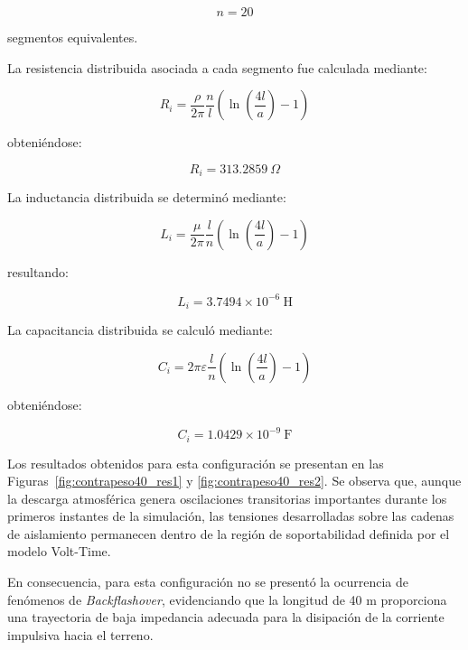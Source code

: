 \documentclass[12pt,letterpaper]{article}
\begin{document}
\begin{equation*}
n=20
\end{equation*}

segmentos equivalentes.

La resistencia distribuida asociada a cada segmento fue calculada mediante:

\begin{equation}
R_i=
\frac{\rho}{2\pi}
\frac{n}{l}
\left(
\ln
\left(
\frac{4l}{a}
\right)-1
\right)
\label{eq:r40}
\end{equation}

obteniéndose:

\begin{equation*}
R_i=313.2859\ \Omega
\end{equation*}

La inductancia distribuida se determinó mediante:

\begin{equation}
L_i=
\frac{\mu}{2\pi}
\frac{l}{n}
\left(
\ln
\left(
\frac{4l}{a}
\right)-1
\right)
\label{eq:l40}
\end{equation}

resultando:

\begin{equation*}
L_i=3.7494\times10^{-6}\ \mathrm{H}
\end{equation*}

La capacitancia distribuida se calculó mediante:

\begin{equation}
C_i=
2\pi\varepsilon
\frac{l}{n}
\left(
\ln
\left(
\frac{4l}{a}
\right)-1
\right)
\label{eq:c40}
\end{equation}

obteniéndose:

\begin{equation*}
C_i=1.0429\times10^{-9}\ \mathrm{F}
\end{equation*}

Los resultados obtenidos para esta configuración se presentan en las Figuras~\ref{fig:contrapeso40_res1} y \ref{fig:contrapeso40_res2}. Se observa que, aunque la descarga atmosférica genera oscilaciones transitorias importantes durante los primeros instantes de la simulación, las tensiones desarrolladas sobre las cadenas de aislamiento permanecen dentro de la región de soportabilidad definida por el modelo Volt-Time.

En consecuencia, para esta configuración no se presentó la ocurrencia de fenómenos de \textit{Backflashover}, evidenciando que la longitud de 40 m proporciona una trayectoria de baja impedancia adecuada para la disipación de la corriente impulsiva hacia el terreno.
\end{document}
